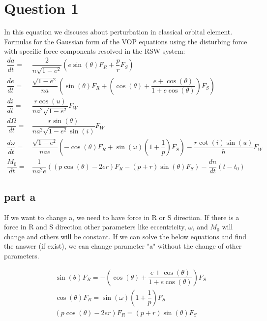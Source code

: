 \section{Question 1}
In this equation we discuses about perturbation in classical orbital element. 
Formulas for the Gaussian form of the VOP equations using the disturbing force with specific force components resolved in the RSW system:
\begin{equation}
    \label{eq:all_perturbation_equations}
\begin{aligned}
\dfrac{da}{dt} = & \dfrac{2}{n\sqrt{1-e^2}} \left( e\sin(\theta) F_R + \dfrac{p}{r}F_S\right) \\
\dfrac{de}{dt} =& \dfrac{\sqrt{1-e^2}}{na}\left(\sin(\theta)F_R+ \left(\cos(\theta) + \dfrac{e+\cos(\theta)}{1+e\cos(\theta)}\right)F_S\right) \\
\dfrac{di}{dt} = &\dfrac{r\cos(u)}{na^2\sqrt{1-e^2}}F_W \\
\dfrac{d\Omega}{dt} = &\dfrac{r\sin(\theta)}{na^2\sqrt{1-e^2}\sin(i)}F_W \\
\dfrac{d\omega}{dt} =& \dfrac{\sqrt{1-e^2}}{nae}\left(-\cos(\theta)F_R + \sin(\omega)\left(1+\dfrac{1}{p}\right)F_S \right) - \dfrac{r\cot(i)\sin(u)}{h}F_W\\
\dfrac{M_0}{dt} =& \dfrac{1}{na^2e} \left((p\cos(\theta) -2er)F_R - (p+r)\sin(\theta)F_S\right)-\dfrac{dn}{dt}(t - t_0)
\end{aligned}
\end{equation}
\subsection{part a}

If we want to change a, we need to have force in R or S direction. If there is a force in R and S direction other parameters like eccentricity, $\omega$, and $M_0$ will change and others will be constant. If we can solve the below equations and find the answer (if exist), we can change parameter "a" without the change of other parameters.

\begin{equation}
    \begin{aligned}
        &\sin(\theta)F_R = - \left(\cos(\theta) + \dfrac{e+\cos(\theta)}{1+e\cos(\theta)}\right)F_S\\
        &\cos(\theta)F_R = \sin(\omega)\left(1+\dfrac{1}{p}\right)F_S\\
        &(p\cos(\theta) -2er)F_R = (p+r)\sin(\theta)F_S
    \end{aligned}
\end{equation}
